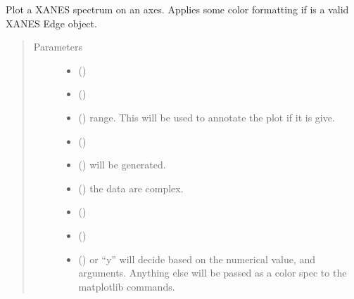 \documentclass[letterpaper,10pt,english]{sphinxmanual}
\begin{document}
\begin{fulllineitems}
\label{\detokenize{xanespy:xanespy.plots.plot_xanes_spectrum}}
Plot a XANES spectrum on an axes. Applies some color formatting if
 is a valid XANES Edge object.
\begin{quote}\begin{description}
\item[{Parameters}] \leavevmode\begin{itemize}
\item {} 
 (\sphinxstyleliteralemphasis{-}) \textendash{} 

\item {} 
 (\sphinxstyleliteralemphasis{-}) \textendash{} 

\item {} 
 (\sphinxstyleliteralemphasis{-}) \textendash{} range. This will be used to annotate the plot if it is give.

\item {} 
 (\sphinxstyleliteralemphasis{-}) \textendash{} 

\item {} 
 (\sphinxstyleliteralemphasis{-}) \textendash{} will be generated.

\item {} 
 (\sphinxstyleliteralemphasis{-}) \textendash{} the data are complex.

\item {} 
 (\sphinxstyleliteralemphasis{-}) \textendash{} 

\item {} 
 (\sphinxstyleliteralemphasis{-}) \textendash{} 

\item {} 
 (\sphinxstyleliteralemphasis{-}) \textendash{} or “y” will decide based on the numerical value,  and
 arguments. Anything else will be passed as a color spec
to the matplotlib commands.

\end{itemize}

\end{description}\end{quote}

\end{fulllineitems}
\end{document}
